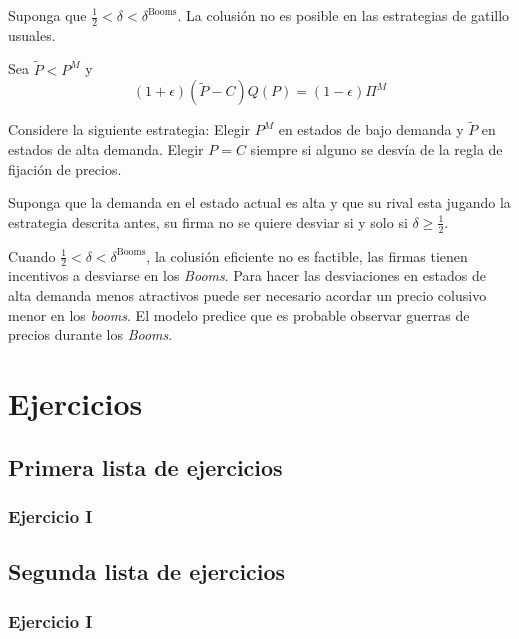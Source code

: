 \documentclass[letterpaper,12pt,twocolumn]{report}
\begin{document}
Suponga que $\frac{1}{2}<\delta < \delta^{\text{Booms}}$. La colusión no es posible en las estrategias de gatillo usuales. 

Sea $\tilde{P}<P^{M}$ y $$(1+\epsilon)(\tilde{P}-C)Q(P)=(1-\epsilon)\Pi^M$$

Considere la siguiente estrategia: Elegir $P^M$ en estados de bajo demanda y $\tilde{P}$ en estados de alta demanda. Elegir $P=C$ siempre si alguno se desvía de la regla de fijación de precios.

Suponga que la demanda en el estado actual es alta y que su rival esta jugando la estrategia descrita antes, su firma no se quiere desviar si y solo si $\delta\geq \frac{1}{2}$.

Cuando $\frac{1}{2}<\delta<\delta^{\text{Booms}}$, la colusión eficiente no es factible, las firmas tienen incentivos a desviarse en los \textit{Booms}. Para hacer las desviaciones en estados de alta demanda menos atractivos puede ser necesario acordar un precio colusivo menor en los \textit{booms}. El modelo predice que es probable observar guerras de precios durante los \textit{Booms}.



\chapter{Ejercicios}

\section{Primera lista de ejercicios}

\subsection*{Ejercicio I}

\section{Segunda lista de ejercicios}

\subsection*{Ejercicio I}
\end{document}
